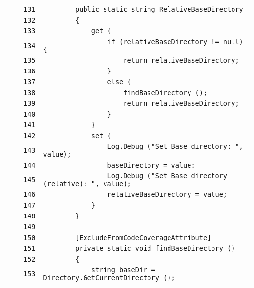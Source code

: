 \documentclass[a4paper,10pt]{article}
\begin{document}
\begin{longtable}[l]{lrrl}
\cellcolor{gray} &  & \verb~131~ & \verb~        public static string RelativeBaseDirectory~\\
\cellcolor{gray} &  & \verb~132~ & \verb~        {~\\
\cellcolor{gray} &  & \verb~133~ & \verb~            get {~\\
\cellcolor{gray} &  & \verb~134~ & \verb~                if (relativeBaseDirectory != null) {~\\
\cellcolor{gray} &  & \verb~135~ & \verb~                    return relativeBaseDirectory;~\\
\cellcolor{gray} &  & \verb~136~ & \verb~                }~\\
\cellcolor{gray} &  & \verb~137~ & \verb~                else {~\\
\cellcolor{gray} &  & \verb~138~ & \verb~                    findBaseDirectory ();~\\
\cellcolor{gray} &  & \verb~139~ & \verb~                    return relativeBaseDirectory;~\\
\cellcolor{gray} &  & \verb~140~ & \verb~                }~\\
\cellcolor{gray} &  & \verb~141~ & \verb~            }~\\
\cellcolor{gray} &  & \verb~142~ & \verb~            set {~\\
\cellcolor{gray} &  & \verb~143~ & \verb~                Log.Debug ("Set Base directory: ", value);~\\
\cellcolor{gray} &  & \verb~144~ & \verb~                baseDirectory = value;~\\
\cellcolor{gray} &  & \verb~145~ & \verb~                Log.Debug ("Set Base directory (relative): ", value);~\\
\cellcolor{gray} &  & \verb~146~ & \verb~                relativeBaseDirectory = value;~\\
\cellcolor{gray} &  & \verb~147~ & \verb~            }~\\
\cellcolor{gray} &  & \verb~148~ & \verb~        }~\\
\cellcolor{gray} &  & \verb~149~ & \verb~~\\
\cellcolor{gray} &  & \verb~150~ & \verb~        [ExcludeFromCodeCoverageAttribute]~\\
\cellcolor{gray} &  & \verb~151~ & \verb~        private static void findBaseDirectory ()~\\
\cellcolor{gray} &  & \verb~152~ & \verb~        {~\\
\cellcolor{gray} &  & \verb~153~ & \verb~            string baseDir = Directory.GetCurrentDirectory ();~\\

\end{longtable}
\end{document}

